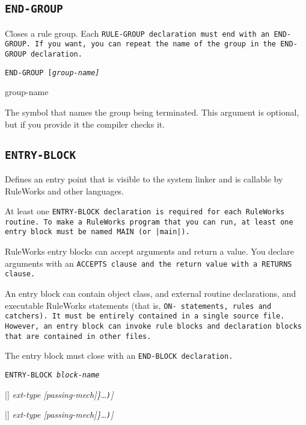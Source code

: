 \subsection{\tt{END-GROUP}}

Closes a rule group. Each \tt{RULE-GROUP} declaration must end with an
\tt{END-GROUP}. If you want, you can repeat the name of the group in
the \tt{END-GROUP} declaration.

\Format

\tt{END-GROUP} [\it{group-name}]

\begin{arguments}
\item[group-name]

  The symbol that names the group being terminated. This argument is
  optional, but if you provide it the compiler checks it.
\end{arguments}

\subsection{\tt{ENTRY-BLOCK}}

Defines an entry point that is visible to the system linker and is
callable by RuleWorks and other languages.

At least one \tt{ENTRY-BLOCK} declaration is required for each
RuleWorks routine. To make a RuleWorks program that you can run, at
least one entry block must be named \tt{MAIN} (or \tt{|main|}).

RuleWorks entry blocks can accept arguments and return a value.
You declare arguments with an \tt{ACCEPTS} clause and the return value
with a \tt{RETURNS} clause.

An entry block can contain object class, and external routine
declarations, and executable RuleWorks statements (that is, \tt{ON-}
statements, rules and catchers). It must be entirely contained in a
single source file. However, an entry block can invoke rule blocks and
declaration blocks that are contained in other files.

The entry block must close with an \tt{END-BLOCK} declaration.

\Format

\tt{ENTRY-BLOCK} \it{block-name}

\qquad[\tt{(ACCEPTS} \{\verb|<|\it{f-param-name}\verb|>|
[\verb|[|\it{size}\verb|]|] \it{ext-type} [\it{passing-mech}]\}\ldots\verb|)|]

\qquad[\tt{(RETURNS} \{\verb|<|\it{f-param-name}\verb|>|
[\verb|[|\it{size}\verb|]|] \it{ext-type} [\it{passing-mech}]\}\ldots\verb|)|]

